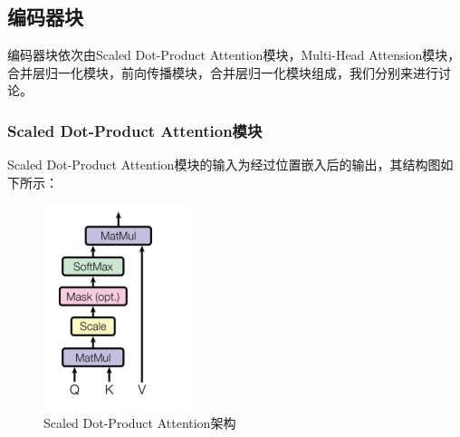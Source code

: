 \documentclass{article}
\begin{document}
\subsection{编码器块}
编码器块依次由Scaled Dot-Product Attention模块，Multi-Head Attension模块，合并层归一化模块，前向传播模块，合并层归一化模块组成，我们分别来进行讨论。
\subsubsection{Scaled Dot-Product Attention模块}
Scaled Dot-Product Attention模块的输入为经过位置嵌入后的输出，其结构图如下所示：
\begin{figure}[H]
    \caption{Scaled Dot-Product Attention架构}
    \label{f000080}
    \centering
    \includegraphics[height=6cm]{images/f000080}
\end{figure}
\end{document}
